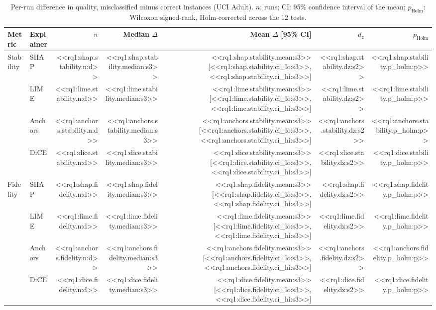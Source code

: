 \documentclass[12pt,letterpaper]{article}
\begin{document}
\begin{table}[ht]
\centering
\caption{Per-run difference in quality, misclassified minus correct instances (UCI Adult).
$n$: runs; CI: 95\% confidence interval of the mean; $p_{\mathrm{Holm}}$: Wilcoxon
signed-rank, Holm-corrected across the 12 tests.}
\label{tab:rq1}
\small
\begin{tabular}{llrrrrr}
\toprule
Metric & Explainer & $n$ & Median $\Delta$ & Mean $\Delta$ [95\% CI] & $d_z$ & $p_{\mathrm{Holm}}$ \\
\midrule
Stability & SHAP & <<rq1:shap.stability.n:d>> & <<rq1:shap.stability.median:s3>> & <<rq1:shap.stability.mean:s3>> [<<rq1:shap.stability.ci_lo:s3>>, <<rq1:shap.stability.ci_hi:s3>>] & <<rq1:shap.stability.dz:s2>> & <<rq1:shap.stability.p_holm:p>> \\
 & LIME & <<rq1:lime.stability.n:d>> & <<rq1:lime.stability.median:s3>> & <<rq1:lime.stability.mean:s3>> [<<rq1:lime.stability.ci_lo:s3>>, <<rq1:lime.stability.ci_hi:s3>>] & <<rq1:lime.stability.dz:s2>> & <<rq1:lime.stability.p_holm:p>> \\
 & Anchors & <<rq1:anchors.stability.n:d>> & <<rq1:anchors.stability.median:s3>> & <<rq1:anchors.stability.mean:s3>> [<<rq1:anchors.stability.ci_lo:s3>>, <<rq1:anchors.stability.ci_hi:s3>>] & <<rq1:anchors.stability.dz:s2>> & <<rq1:anchors.stability.p_holm:p>> \\
 & DiCE & <<rq1:dice.stability.n:d>> & <<rq1:dice.stability.median:s3>> & <<rq1:dice.stability.mean:s3>> [<<rq1:dice.stability.ci_lo:s3>>, <<rq1:dice.stability.ci_hi:s3>>] & <<rq1:dice.stability.dz:s2>> & <<rq1:dice.stability.p_holm:p>> \\
\midrule
Fidelity & SHAP & <<rq1:shap.fidelity.n:d>> & <<rq1:shap.fidelity.median:s3>> & <<rq1:shap.fidelity.mean:s3>> [<<rq1:shap.fidelity.ci_lo:s3>>, <<rq1:shap.fidelity.ci_hi:s3>>] & <<rq1:shap.fidelity.dz:s2>> & <<rq1:shap.fidelity.p_holm:p>> \\
 & LIME & <<rq1:lime.fidelity.n:d>> & <<rq1:lime.fidelity.median:s3>> & <<rq1:lime.fidelity.mean:s3>> [<<rq1:lime.fidelity.ci_lo:s3>>, <<rq1:lime.fidelity.ci_hi:s3>>] & <<rq1:lime.fidelity.dz:s2>> & <<rq1:lime.fidelity.p_holm:p>> \\
 & Anchors & <<rq1:anchors.fidelity.n:d>> & <<rq1:anchors.fidelity.median:s3>> & <<rq1:anchors.fidelity.mean:s3>> [<<rq1:anchors.fidelity.ci_lo:s3>>, <<rq1:anchors.fidelity.ci_hi:s3>>] & <<rq1:anchors.fidelity.dz:s2>> & <<rq1:anchors.fidelity.p_holm:p>> \\
 & DiCE & <<rq1:dice.fidelity.n:d>> & <<rq1:dice.fidelity.median:s3>> & <<rq1:dice.fidelity.mean:s3>> [<<rq1:dice.fidelity.ci_lo:s3>>, <<rq1:dice.fidelity.ci_hi:s3>>] & <<rq1:dice.fidelity.dz:s2>> & <<rq1:dice.fidelity.p_holm:p>> \\

\end{tabular}
\end{table}
\end{document}
